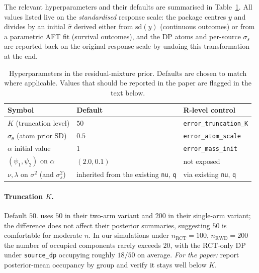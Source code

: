 \documentclass[11pt]{article}
\theoremstyle{plain}
\theoremstyle{definition}
\theoremstyle{remark}
\newcommand{\1}{\mathds{1}}
\begin{document}
The relevant hyperparameters and their defaults are summarised in Table~\ref{tab:hyperparams}. All values listed live on the \emph{standardised} response scale: the package centres $y$ and divides by an initial $\hat\sigma$ derived either from $\mathrm{sd}(y)$ (continuous outcomes) or from a parametric AFT fit (survival outcomes), and the DP atoms and per-source $\sigma_s$ are reported back on the original response scale by undoing this transformation at the end.

\begin{table}[tb]
\centering
\small
\begin{tabular}{lll}
\hline
Symbol & Default & R-level control \\
\hline
$K$ (truncation level)           & $50$            & \texttt{error\_truncation\_K} \\
$\sigma_\theta$ (atom prior SD)  & $0.5$           & \texttt{error\_atom\_scale} \\
$\alpha$ initial value           & $1$             & \texttt{error\_mass\_init} \\
$(\psi_1, \psi_2)$ on $\alpha$   & $(2.0, 0.1)$    & not exposed \\
$\nu, \lambda$ on $\sigma^2$ (and $\sigma_s^2$) & inherited from the existing \texttt{nu}, \texttt{q} & via existing \texttt{nu}, \texttt{q} \\
\hline
\end{tabular}
\caption{Hyperparameters in the residual-mixture prior. Defaults are chosen to match \citet{henderson2020individualized} where applicable. Values that should be reported in the paper are flagged in the text below.}
\label{tab:hyperparams}
\end{table}

\paragraph{Truncation $K$.} Default $50$. \citet{henderson2020individualized} uses $50$ in their two-arm variant and $200$ in their single-arm variant; the difference does not affect their posterior summaries, suggesting $50$ is comfortable for moderate $n$. In our simulations under $n_\mathrm{RCT} = 100$, $n_\mathrm{RWD} = 200$ the number of occupied components rarely exceeds $20$, with the RCT-only DP under \texttt{source\_dp} occupying roughly $18/50$ on average. \emph{For the paper:} report posterior-mean occupancy by group and verify it stays well below $K$.
\end{document}
